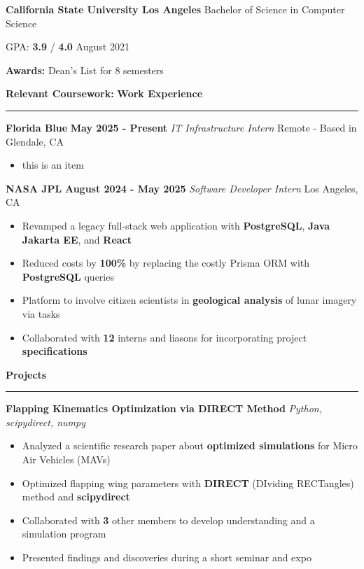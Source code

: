 \documentclass[11pt]{article}
\begin{document}
\raggedright{
\textbf{California State University Los Angeles}
\hfill{Bachelor of Science in Computer Science}

GPA: \textbf{3.9} / \textbf{4.0}
\hfill{August 2021}

\textbf{Awards: }Dean's List for 8 semesters
\newline

\textbf{Relevant Coursework:}
\textbf{Work Experience}
\vspace{-10pt}
\newline
\rule{\textwidth}{0.4pt}

\textbf{Florida Blue}
\hfill
\textbf{May 2025 - Present}
\newline
\textit{IT Infrastructure Intern}%
\hfill
Remote - Based in Glendale, CA

\begin{itemize}[itemsep=0pt, topsep=0pt]
\item this is an item
\end{itemize}

\textbf{NASA JPL}
\hfill
\textbf{August 2024 - May 2025}
\newline
\textit{Software Developer Intern}%
\hfill
Los Angeles, CA
\begin{itemize}[itemsep=0pt, topsep=0pt]
\item Revamped a legacy full-stack web application with
\textbf{
PostgreSQL},
\textbf{
Java Jakarta EE},
and \textbf{
React}
\item Reduced costs by \textbf{100\%} by replacing the costly Prisma ORM with \textbf{PostgreSQL} queries
\item Platform to involve citizen scientists in \textbf{geological analysis} of lunar imagery via tasks
\item Collaborated with \textbf{12} interns and liasons for incorporating project \textbf{specifications}
\end{itemize}

\textbf{Projects}
\vspace{-10pt}
\newline
\rule{\textwidth}{0.4pt}

\textbf{Flapping Kinematics Optimization via DIRECT Method {\textbar}}
\textit{
{
Python,
scipydirect,
numpy}
}
\begin{itemize}[itemsep=0pt, topsep=0pt]
\item Analyzed a scientific research paper about \textbf{optimized simulations} for Micro Air Vehicles (MAVs)
\item Optimized flapping wing parameters with \textbf{DIRECT} (DIviding RECTangles) method and \textbf{scipydirect}
\item Collaborated with \textbf{3} other members to develop understanding and a simulation program
\item Presented findings and discoveries during a short seminar and expo
\end{itemize}


}
\end{document}

